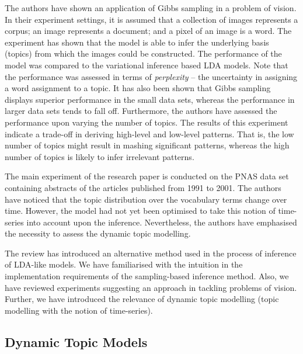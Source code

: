\documentclass{mprop}
\begin{document}
\par The authors have shown an application of Gibbs sampling in a problem of vision. In their experiment settings, it is assumed that a collection of images represents a corpus; an image represents a document; and a pixel of an image is a word. The experiment has shown that the model is able to infer the underlying basis (topics) from which the images could be constructed. The performance of the model was compared to the variational inference based LDA models. Note that the performance was assessed in terms of \textit{perplexity} -- the uncertainty in assigning a word assignment to a topic. It has also been shown that Gibbs sampling displays superior performance in the small data sets, whereas the performance in larger data sets tends to fall off. Furthermore, the authors have assessed the performance upon varying the number of topics. The results of this experiment indicate a trade-off in deriving high-level and low-level patterns. That is, the low number of topics might result in mashing significant patterns, whereas the high number of topics is likely to infer irrelevant patterns.

\par The main experiment of the research paper is conducted on the PNAS data set containing abstracts of the articles published from 1991 to 2001. The authors have noticed that the topic distribution over the vocabulary terms change over time. However, the model had not yet been optimised to take this notion of time-series into account upon the inference. Nevertheless, the authors have emphasised the necessity to assess the dynamic topic modelling. 

\par The review has introduced an alternative method used in the process of inference of LDA-like models. We have familiarised with the intuition in the implementation requirements of the sampling-based inference method. Also, we have reviewed experiments suggesting an approach in tackling problems of vision. Further, we have introduced the relevance of dynamic topic modelling (topic modelling with the notion of time-series). 

\subsection{Dynamic Topic Models}
\end{document}
